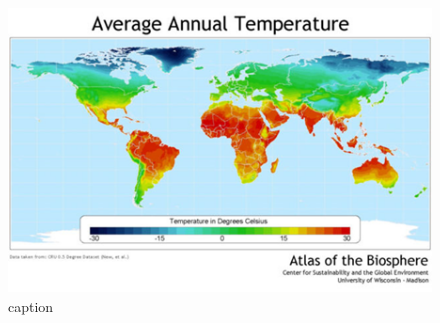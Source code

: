 \documentclass[12pt,oneside]{book}
\begin{document}
\begin{figure}

{\centering \includegraphics[width=0.8\linewidth]{figures/Figure812} 

}

\caption{caption}\label{fig:Vegetationzones7}
\end{figure}


\end{document}
